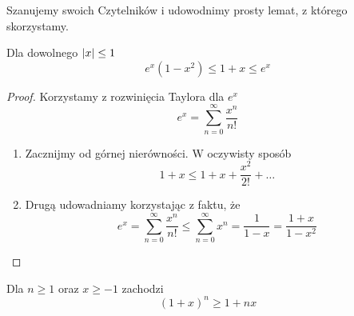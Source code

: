 Szanujemy swoich Czytelników i udowodnimy prosty lemat, z którego skorzystamy.
\begin{lemma}
    Dla dowolnego \( \left\lvert x\right\rvert \leq 1 \)
    \[
        e^x(1 - x^2) \leq 1 + x \leq e^x
    \]
\end{lemma}
\begin{proof}
    Korzystamy z rozwinięcia Taylora dla \( e^x \)
    \[
        e^x = \sum_{n=0}^\infty \frac{x^n}{n!}
    \]
    \begin{enumerate}
        \item Zacznijmy od górnej nierówności. W oczywisty sposób
        \[
            1 + x \leq 1 + x + \frac{x^2}{2!} + \dots
        \]
        \item Drugą udowadniamy korzystając z faktu, że 
        \[
            e^x = \sum_{n=0}^\infty \frac{x^n}{n!} \leq \sum_{n=0}^\infty x^n = \frac{1}{1-x} = \frac{1 + x}{1 - x^2}
        \]
    \end{enumerate}
\end{proof}
\begin{lemma}
    Dla \( n \geq 1 \) oraz \(x \geq -1\) zachodzi
    \[
        (1 + x)^n \geq 1 + nx
    \]
\end{lemma}

